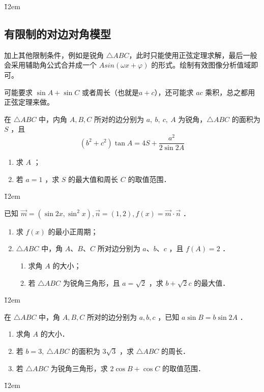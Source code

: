 \v{12em}

\subsection{有限制的对边对角模型}

\begin{theorem}[有限制的对边对角模型]
    加上其他限制条件，例如是锐角 $\triangle ABC$，此时只能使用正弦定理求解，最后一般会采用辅助角公式合并成一个 $Asin(\omega x + \varphi)$ 的形式。绘制有效图像分析值域即可。

    可能要求 $\sin A + \sin C$ 或者周长（也就是$a + c$），还可能求 $ac$ 乘积，总之都用正弦定理来做。
\end{theorem}

\begin{example}
    在 $\triangle A B C$ 中，内角 $A, B, C$ 所对的边分别为 $a, ~ b, ~ c, ~ A$ 为锐角，$\triangle A B C$ 的面积为 $S$ ，且
    $$
        \left(b^2+c^2\right) \tan A=4 S+\frac{a^2}{2 \sin 2 A}
    $$
    \begin{enumerate}
        \item 求 $A$ ；
        \item 若 $a=1$ ，求 $S$ 的最大值和周长 $C$ 的取值范围．
    \end{enumerate}
\end{example}

\v{12em}

\begin{example}
    已知 $\overrightarrow{m}=\left(\sin 2 x, \sin ^2 x\right), \overrightarrow{n}=(1,2), f(x)=\overrightarrow{m} \cdot \overrightarrow{n}$ ．
    \begin{enumerate}
        \item 求 $f(x)$ 的最小正周期；
        \item $\triangle A B C$ 中，角 $A$、$B$、$C$ 所对边分别为 $a$、$b$、$c$ ，且 $f(A)=2$ ．
              \begin{enumerate}
                  \item 求角 $A$ 的大小；
                  \item 若 $\triangle A B C$ 为锐角三角形，且 $a=\sqrt{2}$ ，求 $b+\sqrt{2} c$ 的最大值．
              \end{enumerate}
    \end{enumerate}
\end{example}

\v{12em}

\begin{example}
    在 $\triangle A B C$ 中，角 $A, B, C$ 所对的边分别为 $a, b, c$ ，已知 $a \sin B=b \sin 2 A$ ．
    \begin{enumerate}
        \item 求角 $A$ 的大小．
        \item 若 $b=3, ~ \triangle A B C$ 的面积为 $3 \sqrt{3}$ ，求 $\triangle A B C$ 的周长．
        \item 若 $\triangle A B C$ 为锐角三角形，求 $2 \cos B+\cos C$ 的取值范围．
    \end{enumerate}
\end{example}

\v{12em}
